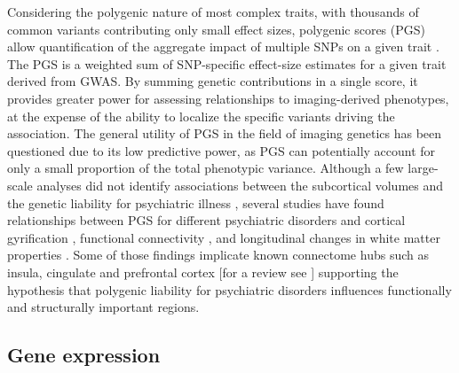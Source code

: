 Considering the polygenic nature of most complex traits, with thousands of common variants contributing only small effect sizes, polygenic scores (PGS) allow quantification of the aggregate impact of multiple SNPs on a given trait \citep{Dudbridge2013}. The PGS is a weighted sum of SNP-specific effect-size estimates for a given trait derived from GWAS. By summing genetic contributions in a single score, it provides greater power for assessing relationships to imaging-derived phenotypes, at the expense of the ability to localize the specific variants driving the association. The general utility of PGS in the field of imaging genetics has been questioned due to its low predictive power, as PGS can potentially account for only a small proportion of the total phenotypic variance. Although a few large-scale analyses did not identify associations between the subcortical volumes and the genetic liability for psychiatric illness \citep{Franke2016,Reus2017}, several studies have found relationships between PGS for different psychiatric disorders and cortical gyrification \citep{Liu2016a}, functional connectivity \citep{Dezhina2018,Wang2017}, and longitudinal changes in white matter properties \citep{Alloza2018}. Some of those findings implicate known connectome hubs such as insula, cingulate and prefrontal cortex [for a review see \citet{Dezhina2018}] supporting the hypothesis that polygenic liability for psychiatric disorders influences functionally and structurally important regions. 

\subsection{Gene expression}

